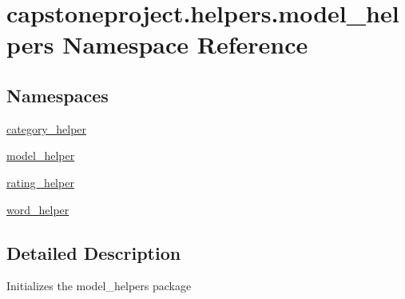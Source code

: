 \hypertarget{namespacecapstoneproject_1_1helpers_1_1model__helpers}{}\section{capstoneproject.\+helpers.\+model\+\_\+helpers Namespace Reference}
\label{namespacecapstoneproject_1_1helpers_1_1model__helpers}
\subsection*{Namespaces}
\begin{DoxyCompactItemize}
\item 
 \mbox{\hyperlink{namespacecapstoneproject_1_1helpers_1_1model__helpers_1_1category__helper}{category\+\_\+helper}}
\item 
 \mbox{\hyperlink{namespacecapstoneproject_1_1helpers_1_1model__helpers_1_1model__helper}{model\+\_\+helper}}
\item 
 \mbox{\hyperlink{namespacecapstoneproject_1_1helpers_1_1model__helpers_1_1rating__helper}{rating\+\_\+helper}}
\item 
 \mbox{\hyperlink{namespacecapstoneproject_1_1helpers_1_1model__helpers_1_1word__helper}{word\+\_\+helper}}
\end{DoxyCompactItemize}


\subsection{Detailed Description}
\begin{DoxyVerb}Initializes the model_helpers package
\end{DoxyVerb}
 